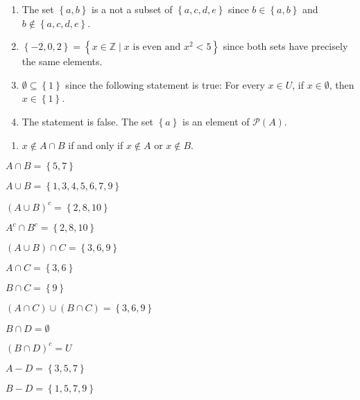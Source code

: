 \begin{list}{\bf{\ref{exer:sec41-5}.}}
\item \begin{enumerate}
\item The set $\left\{ {a, b} \right\}$ is a not a subset of  $\left\{ {a, c, d, e} \right\}$
 since  $b \in \left\{ {a, b} \right\}$ and  $b \notin \left\{ {a, c, d, e} \right\}$.

\item $\left\{ { - 2,0,2} \right\} = \left\{ {x \in \mathbb{Z} \mid  
x\text{ is even  and  }x^2  < 5} \right\}$ since both sets have precisely the same elements.

\item $\emptyset \subseteq \left\{ 1 \right\}$ since the following statement is true:
For every $x \in U$, if $x \in \emptyset$, then $x \in \left\{ 1 \right\}$.

\item The statement is false.  The set $\left\{ a \right\}$ is an element of 
$\mathcal{P} \left( A \right)$.
\end{enumerate}
\end{list}

\begin{list}{\bf{\ref{exer:sec41-8}.}}
\item \begin{enumerate}
\item $x \notin A \cap B$ if and only if $x \notin A$ or $x \notin B$.
\end{enumerate}
\end{list}


\begin{list}{\bf{\ref{exer:sec41-6}.}}
\item 
\begin{enumerate}
  \begin{multicols}{2}
  \item $A \cap B = \left\{ 5, 7 \right\}$
  \item $A \cup B = \left\{ 1, 3, 4, 5, 6, 7, 9 \right\}$
  \item $\left( {A \cup B} \right)^c = \left\{ 2, 8, 10 \right\}$
  \item $A^c  \cap B^c = \left\{ 2, 8, 10 \right\}$
  \item $( {A \cup B} ) \cap C = \left\{ {3, 6, 9} \right\}$
  \item $A \cap C = \left\{ 3, 6 \right\}$
  \item $B \cap C = \left\{ 9 \right\}$
  \item $( {A \cap C} ) \cup ( {B \cap C} ) = \left\{ 3, 6, 9 \right\}$
  \item $B \cap D = \emptyset$
  \item $\left( {B \cap D} \right)^c = U$
  \item $A - D = \left\{ 3, 5, 7 \right\}$
  \item $B - D = \left\{ 1, 5, 7, 9 \right\}$
\end{multicols}
\end{enumerate}
\end{list}

